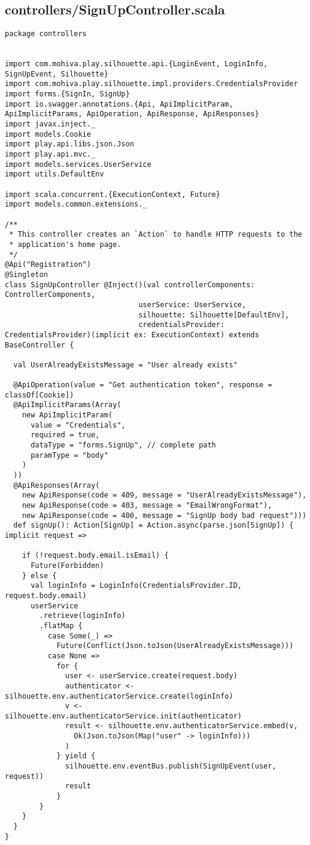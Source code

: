\subsection{controllers/SignUpController.scala}
\begin{lstlisting}
package controllers


import com.mohiva.play.silhouette.api.{LoginEvent, LoginInfo, SignUpEvent, Silhouette}
import com.mohiva.play.silhouette.impl.providers.CredentialsProvider
import forms.{SignIn, SignUp}
import io.swagger.annotations.{Api, ApiImplicitParam, ApiImplicitParams, ApiOperation, ApiResponse, ApiResponses}
import javax.inject._
import models.Cookie
import play.api.libs.json.Json
import play.api.mvc._
import models.services.UserService
import utils.DefaultEnv

import scala.concurrent.{ExecutionContext, Future}
import models.common.extensions._

/**
 * This controller creates an `Action` to handle HTTP requests to the
 * application's home page.
 */
@Api("Registration")
@Singleton
class SignUpController @Inject()(val controllerComponents: ControllerComponents,
                               userService: UserService,
                               silhouette: Silhouette[DefaultEnv],
                               credentialsProvider: CredentialsProvider)(implicit ex: ExecutionContext) extends BaseController {

  val UserAlreadyExistsMessage = "User already exists"

  @ApiOperation(value = "Get authentication token", response = classOf[Cookie])
  @ApiImplicitParams(Array(
    new ApiImplicitParam(
      value = "Credentials",
      required = true,
      dataType = "forms.SignUp", // complete path
      paramType = "body"
    )
  ))
  @ApiResponses(Array(
    new ApiResponse(code = 409, message = "UserAlreadyExistsMessage"),
    new ApiResponse(code = 403, message = "EmailWrongFormat"),
    new ApiResponse(code = 400, message = "SignUp body bad request")))
  def signUp(): Action[SignUp] = Action.async(parse.json[SignUp]) { implicit request =>

    if (!request.body.email.isEmail) {
      Future(Forbidden)
    } else {
      val loginInfo = LoginInfo(CredentialsProvider.ID, request.body.email)
      userService
        .retrieve(loginInfo)
        .flatMap {
          case Some(_) =>
            Future(Conflict(Json.toJson(UserAlreadyExistsMessage)))
          case None =>
            for {
              user <- userService.create(request.body)
              authenticator <- silhouette.env.authenticatorService.create(loginInfo)
              v <- silhouette.env.authenticatorService.init(authenticator)
              result <- silhouette.env.authenticatorService.embed(v,
                Ok(Json.toJson(Map("user" -> loginInfo)))
              )
            } yield {
              silhouette.env.eventBus.publish(SignUpEvent(user, request))
              result
            }
        }
    }
  }
}
\end{lstlisting}

